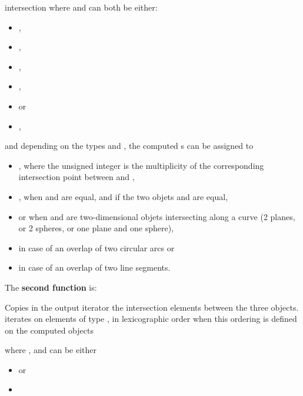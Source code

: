 \begin{ccRefFunction}{intersection}
where  and  can both be either:
\begin{itemize}
\item {} ,
\item {} ,
\item {} ,
\item {} ,
\item {}  or
\item {} ,
\end{itemize} 

and depending on the types  and , the computed 
s can be assigned to 
\begin{itemize}
\item {} ,
where the unsigned integer is the multiplicity of the corresponding
intersection point between  and ,
\item {} , when  and  are equal, 
and if the two objets  and  are equal,
\item {}  or 
 when  and  
are two-dimensional objets intersecting along a curve (2 planes, or 2
spheres, or one plane and one sphere),
\item {}  in case of an overlap of 
two circular arcs or
\item {}  in case of an overlap of two 
line segments. 
\end{itemize} 

The \textbf{second function} is:

{Copies in the output iterator the intersection elements between the
three objects.  iterates on
elements of type , in lexicographic order 
when this ordering is defined on the computed objects}

where ,  and 
can be either
\begin{itemize}
\item {}  or
\item {} 
\end{itemize}


\end{ccRefFunction}
